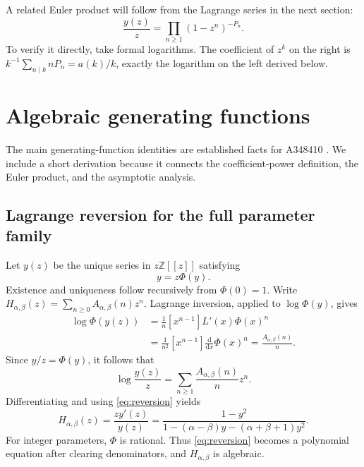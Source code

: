 \documentclass[11pt,a4paper]{article}
\numberwithin{equation}{section}
\theoremstyle{definition}
\theoremstyle{remark}
\newcommand{\Z}{\mathbb Z}
\newcommand{\A}{A_{\alpha,\beta}}
\begin{document}
A related Euler product will follow from the Lagrange series in the next
section:
\begin{equation}\label{eq:euler-product}
 \frac{y(z)}z=\prod_{n\ge1}(1-z^n)^{-P_n}.
\end{equation}
To verify it directly, take formal logarithms. The coefficient of $z^k$
on the right is $k^{-1}\sum_{n\mid k}nP_n=a(k)/k$, exactly the logarithm
on the left derived below.

\section{Algebraic generating functions}
\label{sec:gf}

The main generating-function identities are established facts for A348410
\cite{oeis348410,niu,prodinger}. We include a short derivation because it
connects the coefficient-power definition, the Euler product, and the
asymptotic analysis.

\subsection{Lagrange reversion for the full parameter family}
Let $y(z)$ be the unique series in $z\Z[[z]]$ satisfying
\begin{equation}\label{eq:reversion}
 y=z\Phi(y).
\end{equation}
Existence and uniqueness follow recursively from $\Phi(0)=1$. Write
$H_{\alpha,\beta}(z)=\sum_{n\ge0}\A(n)z^n$.
Lagrange inversion, applied to $\log\Phi(y)$, gives
\begin{align*}
 [z^n]\log\Phi(y(z))
 &=\frac1n[x^{n-1}]L'(x)\Phi(x)^n\\
 &=\frac1{n^2}[x^{n-1}]\frac{\mathrm d}{\mathrm dx}\Phi(x)^n
 =\frac{\A(n)}n.
\end{align*}
Since $y/z=\Phi(y)$, it follows that
\begin{equation}\label{eq:log-y}
 \log\frac{y(z)}z=\sum_{n\ge1}\frac{\A(n)}n z^n.
\end{equation}
Differentiating and using \eqref{eq:reversion} yields
\begin{equation}\label{eq:Hparam}
 H_{\alpha,\beta}(z)=\frac{zy'(z)}{y(z)}
 =\frac{1-y^2}
 {1-(\alpha-\beta)y-(\alpha+\beta+1)y^2}.
\end{equation}
For integer parameters, $\Phi$ is rational. Thus \eqref{eq:reversion}
becomes a polynomial equation after clearing denominators, and
$H_{\alpha,\beta}$ is algebraic.
\end{document}
